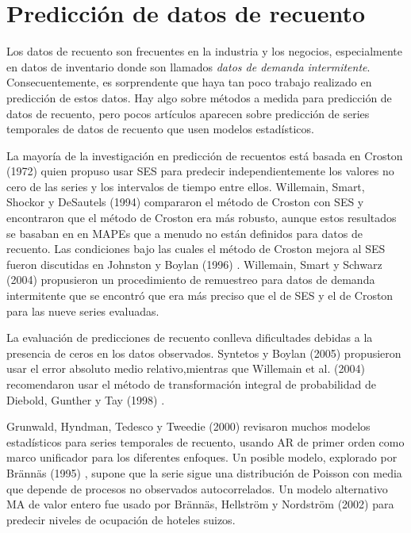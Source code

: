 \documentclass{llncs}
\begin{document}
\section{Predicción de datos de recuento}
Los datos de recuento son frecuentes en la industria y los negocios, especialmente en datos de inventario donde son llamados \emph{datos de demanda intermitente}. Consecuentemente, es sorprendente que haya tan poco trabajo realizado en predicción de estos datos. Hay algo sobre métodos a medida para predicción de datos de recuento, pero pocos artículos aparecen sobre predicción de series temporales de datos de recuento que usen modelos estadísticos.

La mayoría de la investigación en predicción de recuentos está basada en Croston (1972) \cite{Croston1972289} quien propuso usar SES para predecir independientemente los valores no cero de las series y los intervalos de tiempo entre ellos. Willemain, Smart, Shockor y DeSautels (1994) \cite{Willemain1994529} compararon el método de Croston con SES y encontraron que el método de Croston era más robusto, aunque estos resultados se basaban en en MAPEs que a menudo no están definidos para datos de recuento. Las condiciones bajo las cuales el método de Croston mejora al SES fueron discutidas en Johnston y Boylan (1996) \cite{Johnston1996297}. Willemain, Smart y Schwarz (2004) propusieron un procedimiento de remuestreo para datos de demanda intermitente que se encontró que era más preciso que el de SES y el de Croston para las nueve series evaluadas.

La evaluación de predicciones de recuento conlleva dificultades debidas a la presencia de ceros en los datos observados. Syntetos y Boylan (2005) \cite{Syntetos2005303} propusieron usar el error absoluto medio relativo,mientras que Willemain et al. (2004) \cite{Willemain2004375} recomendaron usar el método de transformación integral de probabilidad de Diebold, Gunther y Tay (1998) \cite{Diebold1998863}.

Grunwald, Hyndman, Tedesco y Tweedie (2000) revisaron muchos modelos estadísticos para series temporales de recuento, usando AR de primer orden como marco unificador para los diferentes enfoques. Un posible modelo, explorado por Brännäs (1995) \cite{Brannas200219}, supone que la serie sigue una distribución de Poisson con media que depende de procesos no observados autocorrelados. Un modelo alternativo MA de valor entero fue usado por Brännäs, Hellström y Nordström (2002) para predecir niveles de ocupación de hoteles suizos.
\end{document}
